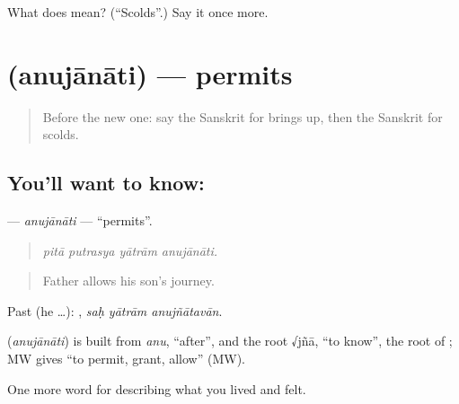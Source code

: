 \begin{tcolorbox}[breakable,colback=teal!4,colframe=teal!35!black,title={Before you move on}]
What does  mean? (\textquotedblleft{}Scolds\textquotedblright{}.) Say it once more.
\end{tcolorbox}
\section[\texorpdfstring{\sk{अनुजानाति} (anujānāti)}{अनुजानाति (anujānāti)}]{ (anujānāti) — permits}

\label{lesson:SA-C494-anujanati}



\begin{quote}
Before the new one: say the Sanskrit for brings up, then the Sanskrit for scolds.
\end{quote}

\subsection*{You'll want to know: }
\textbf{} — \emph{anujānāti} — \textquotedblleft{}permits\textquotedblright{}.

\begin{quote}
   
\end{quote}

\begin{quote}
\emph{pitā putrasya yātrām anujānāti.}
\end{quote}

\begin{quote}
Father allows his son's journey.
\end{quote}

Past (he …):   , \emph{saḥ yātrām anujñātavān}.

\begin{cousinweb}
\textbf{} (\emph{anujānāti}) is built from \emph{anu}, \textquotedblleft{}after\textquotedblright{}, and the root √jñā, \textquotedblleft{}to know\textquotedblright{}, the root of \textbf{}; MW gives \textquotedblleft{}to permit, grant, allow\textquotedblright{} (MW).
\end{cousinweb}

\begin{grammarlens}[title={What you've built}]
One more word for describing what you lived and felt.
\end{grammarlens}

